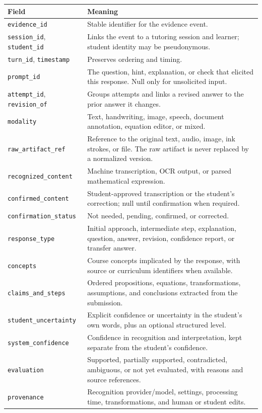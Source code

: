 \documentclass[11pt]{article}
\begin{document}
\noindent\begin{tabularx}{\textwidth}{@{}p{}X@{}}
\toprule
\textbf{Field} & \textbf{Meaning} \\
\midrule
\texttt{evidence\_id} & Stable identifier for the evidence event. \\
\texttt{session\_id}, \texttt{student\_id} & Links the event to a tutoring session and learner; student identity may be pseudonymous. \\
\texttt{turn\_id}, \texttt{timestamp} & Preserves ordering and timing. \\
\texttt{prompt\_id} & The question, hint, explanation, or check that elicited this response. Null only for unsolicited input. \\
\texttt{attempt\_id}, \texttt{revision\_of} & Groups attempts and links a revised answer to the prior answer it changes. \\
\texttt{modality} & Text, handwriting, image, speech, document annotation, equation editor, or mixed. \\
\texttt{raw\_artifact\_ref} & Reference to the original text, audio, image, ink strokes, or file. The raw artifact is never replaced by a normalized version. \\
\texttt{recognized\_content} & Machine transcription, OCR output, or parsed mathematical expression. \\
\texttt{confirmed\_content} & Student-approved transcription or the student's correction; null until confirmation when required. \\
\texttt{confirmation\_status} & Not needed, pending, confirmed, or corrected. \\
\texttt{response\_type} & Initial approach, intermediate step, explanation, question, answer, revision, confidence report, or transfer answer. \\
\texttt{concepts} & Course concepts implicated by the response, with source or curriculum identifiers when available. \\
\texttt{claims\_and\_steps} & Ordered propositions, equations, transformations, assumptions, and conclusions extracted from the submission. \\
\texttt{student\_uncertainty} & Explicit confidence or uncertainty in the student's own words, plus an optional structured level. \\
\texttt{system\_confidence} & Confidence in recognition and interpretation, kept separate from the student's confidence. \\
\texttt{evaluation} & Supported, partially supported, contradicted, ambiguous, or not yet evaluated, with reasons and source references. \\
\texttt{provenance} & Recognition provider/model, settings, processing time, transformations, and human or student edits. \\
\bottomrule
\end{tabularx}
\end{document}
